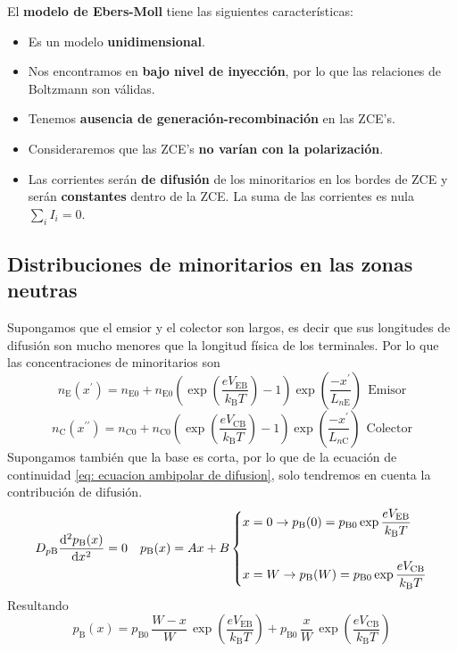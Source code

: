 El \textbf{modelo de Ebers-Moll} tiene las siguientes características:
\begin{itemize}
    \item Es un modelo \textbf{unidimensional}.
    \item Nos encontramos en \textbf{bajo nivel de inyección}, por lo que las relaciones de Boltzmann son válidas.
    \item Tenemos \textbf{ausencia de generación-recombinación} en las ZCE's.
    \item  Consideraremos que las ZCE's \textbf{no varían con la polarización}.
    \item  Las corrientes serán \textbf{de difusión} de los minoritarios en los bordes de ZCE y serán \textbf{constantes} dentro de la ZCE. La suma de las corrientes es nula $\sum_i I_i=0$.
\end{itemize}
\newpage
\subsection{Distribuciones de minoritarios en las zonas neutras}
Supongamos que el emsior y el colector son largos, es decir que sus longitudes de difusión son mucho menores que la longitud física de los terminales. Por lo que las concentraciones de minoritarios son 
\begin{equation}
    n_\mathrm{E}(x^\prime)=n_\mathrm{E0}+n_\mathrm{E0}\left( \exp{\left( \frac{eV_\mathrm{EB}}{k_\mathrm{B}T}\right)-1}\right) \exp{\left( \frac{-x^\prime}{L_{n\mathrm{E}}} \right)} \ \ \text{Emisor}
    \label{eq: Minoritarios emisor}
\end{equation}
\begin{equation}
    n_\mathrm{C}(x^{\prime \prime})=n_\mathrm{C0}+n_\mathrm{C0}\left( \exp{\left( \frac{eV_\mathrm{CB}}{k_\mathrm{B}T}\right)-1}\right) \exp{\left( \frac{-x^\prime}{L_{n\mathrm{C}}} \right)} \ \ \text{Colector}
    \label{eq: minoritarios colector}
\end{equation}
Supongamos también que la base es corta, por lo que de la ecuación de continuidad \ref{eq: ecuacion ambipolar de difusion}, solo tendremos en cuenta la contribución de difusión.
\begin{equation*}
    D_{p \mathrm{B}} \diff[2]{ p_\mathrm{B}(x)}{x}=0 \quad p_\mathrm{B}(x)=A x+B
    \left\{\begin{aligned}
&x=0 \rightarrow p_\mathrm{B}(0)=p_{\mathrm{B} 0} \exp{\frac{e V_\mathrm{EB}}{k_\mathrm{B} T}} \\\\
&x=W \rightarrow p_\mathrm{B}(W)=p_{\mathrm{B} 0} \exp{\frac{e V_\mathrm{CB}}{k_\mathrm{B} T}}
\end{aligned}\right.
\end{equation*}
Resultando
\begin{equation}
    p_\mathrm{B}(x)=p_\mathrm{B0}\, \frac{W-x}{W}\, \exp{\left(\frac{e V_\mathrm{EB}}{k_\mathrm{B} T}\right)} +p_\mathrm{B0}\, \frac{x}{W}\, \exp{\left(\frac{e V_\mathrm{CB}}{k_\mathrm{B} T}\right)}
\end{equation}
